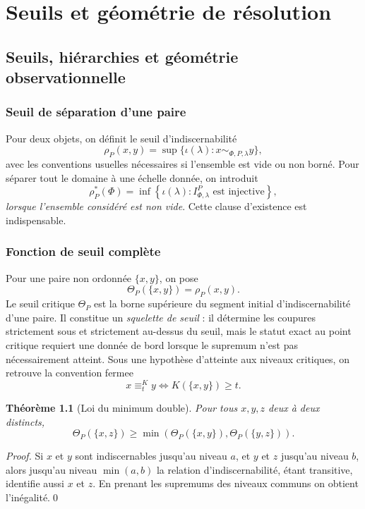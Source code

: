 \documentclass[11pt,a4paper,openany]{book}
\newtheorem{theorem}[definition]{Théorème}
\begin{document}
\part{Seuils et géométrie de résolution}

\chapter{Seuils, hiérarchies et géométrie observationnelle}
\section{Seuil de séparation d'une paire}
Pour deux objets, on définit le seuil d'indiscernabilité
\[
\rho_P(x,y)
=\sup\{\iota(\lambda):x\sim_{\Phi,P,\lambda}y\},
\]
avec les conventions usuelles nécessaires si l'ensemble est vide ou non borné. Pour séparer tout le domaine à une échelle donnée, on introduit
\[
\rho_P^*(\Phi)=
\inf\left\{\iota(\lambda):I_{\Phi,\lambda}^{P}\text{ est injective}\right\},
\]
\emph{lorsque l'ensemble considéré est non vide}. Cette clause d'existence est indispensable.

\section{Fonction de seuil complète}
Pour une paire non ordonnée \(\{x,y\}\), on pose
\[
\Theta_P(\{x,y\})=\rho_P(x,y).
\]
Le seuil critique \(\Theta_P\) est la borne supérieure du segment initial d'indiscernabilité d'une paire. Il constitue un \emph{squelette de seuil} : il détermine les coupures strictement sous et strictement au-dessus du seuil, mais le statut exact au point critique requiert une donnée de bord lorsque le supremum n'est pas nécessairement atteint. Sous une hypothèse d'atteinte aux niveaux critiques, on retrouve la convention fermee
\[
x\equiv_t^K y \iff K(\{x,y\})\ge t.
\]

\begin{theorem}[Loi du minimum double]
Pour tous \(x,y,z\) deux à deux distincts,
\[
\Theta_P(\{x,z\})\ge
\min\left(\Theta_P(\{x,y\}),\Theta_P(\{y,z\})\right).
\]
\end{theorem}
\begin{proof}
Si \(x\) et \(y\) sont indiscernables jusqu'au niveau \(a\), et \(y\) et \(z\) jusqu'au niveau \(b\), alors jusqu'au niveau \(\min(a,b)\) la relation d'indiscernabilité, étant transitive, identifie aussi \(x\) et \(z\). En prenant les supremums des niveaux communs on obtient l'inégalité.\qed\end{proof}
\end{document}
